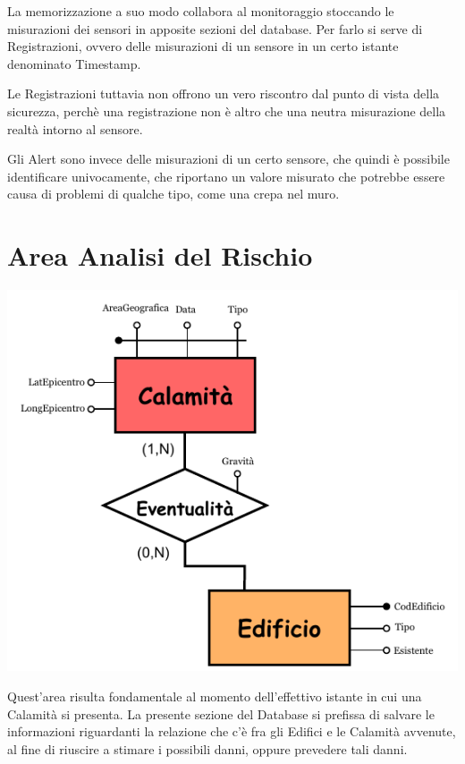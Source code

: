 \documentclass[12pt,a4paper]{report}
\begin{document}
            La memorizzazione a suo modo collabora al monitoraggio stoccando le misurazioni dei sensori in apposite sezioni del database. Per farlo si serve di Registrazioni, ovvero delle misurazioni di un sensore in un certo istante denominato Timestamp.

            Le Registrazioni tuttavia non offrono un vero riscontro dal punto di vista della sicurezza, perchè una registrazione non è altro che una neutra misurazione della realtà intorno al sensore.

            Gli Alert sono invece delle misurazioni di un certo sensore, che quindi è possibile identificare univocamente, che riportano un valore misurato che potrebbe essere causa di problemi di qualche tipo, come una crepa nel muro.
    
\chapter{Area Analisi del Rischio}
        \begin{center}
            \includegraphics{ER_calamita.pdf}
        \end{center}
        Quest'area risulta fondamentale al momento dell'effettivo istante in cui una Calamità si presenta. La presente sezione del Database si prefissa di salvare le informazioni riguardanti la relazione che c'è fra gli Edifici e le Calamità avvenute, al fine di riuscire a stimare i possibili danni, oppure prevedere tali danni.
        
\end{document}
